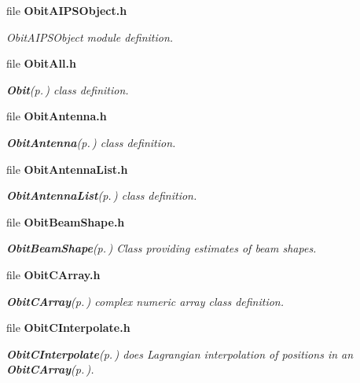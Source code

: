 \begin{CompactItemize}
\item 
file {\bf Obit\-AIPSObject.h}
\begin{CompactList}\small\item\em Obit\-AIPSObject module definition. \item\end{CompactList}

\item 
file {\bf Obit\-All.h}
\begin{CompactList}\small\item\em {\bf Obit}{\rm (p.\,\pageref{structObit})} class definition. \item\end{CompactList}

\item 
file {\bf Obit\-Antenna.h}
\begin{CompactList}\small\item\em {\bf Obit\-Antenna}{\rm (p.\,\pageref{structObitAntenna})} class definition. \item\end{CompactList}

\item 
file {\bf Obit\-Antenna\-List.h}
\begin{CompactList}\small\item\em {\bf Obit\-Antenna\-List}{\rm (p.\,\pageref{structObitAntennaList})} class definition. \item\end{CompactList}

\item 
file {\bf Obit\-Beam\-Shape.h}
\begin{CompactList}\small\item\em {\bf Obit\-Beam\-Shape}{\rm (p.\,\pageref{structObitBeamShape})} Class providing estimates of beam shapes. \item\end{CompactList}

\item 
file {\bf Obit\-CArray.h}
\begin{CompactList}\small\item\em {\bf Obit\-CArray}{\rm (p.\,\pageref{structObitCArray})} complex numeric array class definition. \item\end{CompactList}

\item 
file {\bf Obit\-CInterpolate.h}
\begin{CompactList}\small\item\em {\bf Obit\-CInterpolate}{\rm (p.\,\pageref{structObitCInterpolate})} does Lagrangian interpolation of positions in an {\bf Obit\-CArray}{\rm (p.\,\pageref{structObitCArray})}. \item\end{CompactList}


\end{CompactItemize}
